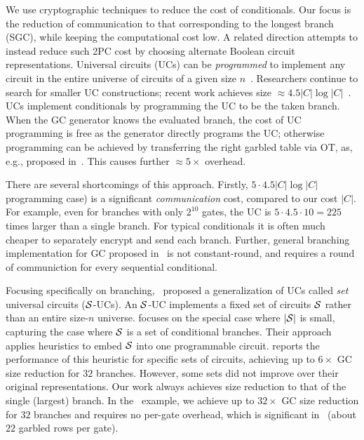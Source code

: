 We use cryptographic techniques to reduce the cost of conditionals.
Our focus is the reduction of communication to that corresponding to
the longest branch (SGC), while keeping the computational cost low.
A related direction attempts to instead reduce such 2PC cost by
choosing alternate Boolean circuit representations.  Universal
circuits (UCs) can be \emph{programmed} to implement any circuit in
the entire universe of circuits of a given size
$n$~\cite{STOC:Valiant76}.  Researchers continue to search for smaller
UC constructions; recent work achieves size $\approx 4.5 |C| \log
|C|$~\cite{EPRINT:LipMohSad16,EC:KisSch16,AC:GunKisSch17,EPRINT:ZYZL19,EPRINT:AGKS19}.
%
UCs implement conditionals by programming the UC to be the taken
branch.  When the GC generator knows the evaluated branch, the cost of
UC programming is free as the generator directly programs the UC;
otherwise programming can be achieved by transferring the right
garbled table via OT, as, e.g., proposed in~\cite{AC:KenKolWil17}.
This causes further $\approx 5\times$ overhead.

There are several shortcomings of this approach.  Firstly,  $5\cdot
4.5 |C| \log |C|$ %
programming case) is a significant {\em communication} cost, compared
to our cost $|C|$.  For example, even for branches with only $2^{10}$
gates, the UC is $5 \cdot 4.5 \cdot 10 = 225$ times larger than a
single branch.  For typical conditionals it is often much cheaper to
separately encrypt and send each branch.  Further, general branching
implementation for GC proposed in~\cite{AC:KenKolWil17} is not
constant-round, and requires a round of communiction for every
sequential conditional.


Focusing specifically on branching,~\cite{AC:KenKolWil17} proposed a
generalization of UCs called \emph{set} universal circuits ($\cal
S$-UCs).  An $\cal S$-UC implements a fixed set of circuits $\cal S$
rather than an entire size-$n$ universe.  \cite{AC:KenKolWil17}
focuses on the special case where $|\cal S|$ is small, capturing the
case where $\cal S$ is a set of conditional branches.  Their approach
applies heuristics to embed $\cal S$ into one programmable circuit.
\cite{AC:KenKolWil17} reports the performance of this heuristic for
specific sets of circuits, achieving up to $6\times$ GC size reduction
for $32$ branches.  However, some sets did not improve over their
original representations.  Our work always achieves size reduction to
that of the single (largest) branch. In the~\cite{AC:KenKolWil17}
example, we achieve up to $32\times$ GC size reduction for $32$
branches and requires no per-gate overhead, which is significant
in~\cite{AC:KenKolWil17} (about $22$ garbled rows per gate).  


